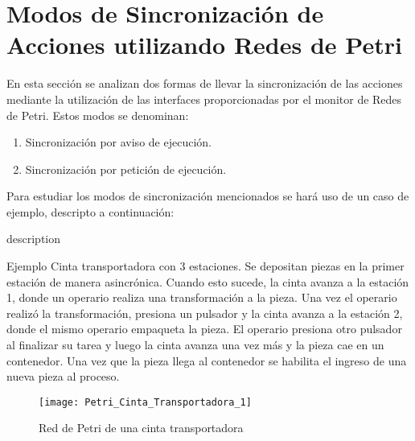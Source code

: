 \section{Modos de Sincronización de Acciones utilizando Redes de Petri}
\label{sec:sincronizacion_cinta_transportadora}
En esta sección se analizan dos formas de llevar la sincronización de las
acciones mediante la utilización de las interfaces proporcionadas por el monitor
de Redes de Petri. Estos modos se denominan:
\begin{enumerate}
  \item Sincronización por aviso de ejecución.
  \item Sincronización por petición de ejecución.
\end{enumerate}

Para estudiar los modos de sincronización mencionados se hará uso de un caso de
ejemplo, descripto a continuación:

\begin{labeling}{description}
\item [Ejemplo]
Cinta transportadora con 3 estaciones. Se depositan piezas en la primer
estación de manera asincrónica. Cuando esto sucede, la cinta avanza a la
estación 1, donde un operario realiza una transformación a la pieza. Una vez el
operario realizó la transformación, presiona un pulsador y la cinta avanza a la
estación 2, donde el mismo operario empaqueta la pieza. El operario
presiona otro pulsador al finalizar su tarea y luego la cinta avanza una vez
más y la pieza cae en un contenedor. Una vez que la pieza llega al contenedor se
habilita el ingreso de una nueva pieza al proceso.
\end{labeling}

\begin{figure}[H]
    \centering
    \texttt{[image: Petri\_Cinta\_Transportadora\_1]}
    \caption{Red de Petri de una cinta transportadora}
    \label{fig:petri_cinta_transportadora_1}
\end{figure}

